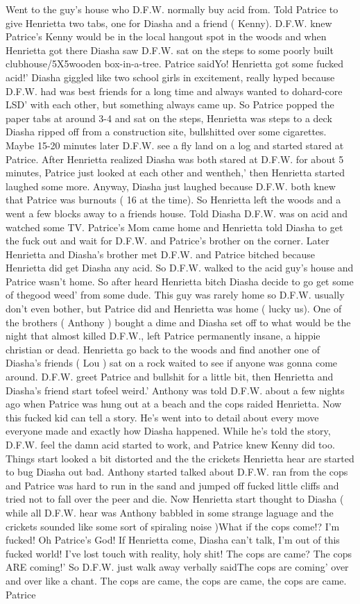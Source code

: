 \documentclass[12pt]{book}
\begin{document}
Went to the guy's house who D.F.W. normally buy acid from. Told Patrice to give Henrietta two tabs, one for Diasha and a friend ( Kenny). D.F.W. knew Patrice's Kenny would be in the local hangout spot in the woods and when Henrietta got there Diasha saw D.F.W. sat on the steps to some poorly built clubhouse/5X5wooden box-in-a-tree. Patrice saidYo! Henrietta got some fucked acid!' Diasha giggled like two school girls in excitement, really hyped because D.F.W. had was best friends for a long time and always wanted to dohard-core LSD' with each other, but something always came up. So Patrice popped the paper tabs at around 3-4 and sat on the steps, Henrietta was steps to a deck Diasha ripped off from a construction site, bullshitted over some cigarettes. Maybe 15-20 minutes later D.F.W. see a fly land on a log and started stared at Patrice. After Henrietta realized Diasha was both stared at D.F.W. for about 5 minutes, Patrice just looked at each other and wentheh,' then Henrietta started laughed some more. Anyway, Diasha just laughed because D.F.W. both knew that Patrice was burnouts ( 16 at the time). So Henrietta left the woods and a went a few blocks away to a friends house. Told Diasha D.F.W. was on acid and watched some TV. Patrice's Mom came home and Henrietta told Diasha to get the fuck out and wait for D.F.W. and Patrice's brother on the corner. Later Henrietta and Diasha's brother met D.F.W. and Patrice bitched because Henrietta did get Diasha any acid. So D.F.W. walked to the acid guy's house and Patrice wasn't home. So after heard Henrietta bitch Diasha decide to go get some of thegood weed' from some dude. This guy was rarely home so D.F.W. usually don't even bother, but Patrice did and Henrietta was home ( lucky us). One of the brothers ( Anthony ) bought a dime and Diasha set off to what would be the night that almost killed D.F.W., left Patrice permanently insane, a hippie christian or dead. Henrietta go back to the woods and find another one of Diasha's friends ( Lou ) sat on a rock waited to see if anyone was gonna come around. D.F.W. greet Patrice and bullshit for a little bit, then Henrietta and Diasha's friend start tofeel weird.' Anthony was told D.F.W. about a few nights ago when Patrice was hung out at a beach and the cops raided Henrietta. Now this fucked kid can tell a story. He's went into to detail about every move everyone made and exactly how Diasha happened. While he's told the story, D.F.W. feel the damn acid started to work, and Patrice knew Kenny did too. Things start looked a bit distorted and the the crickets Henrietta hear are started to bug Diasha out bad. Anthony started talked about D.F.W. ran from the cops and Patrice was hard to run in the sand and jumped off fucked little cliffs and tried not to fall over the peer and die. Now Henrietta start thought to Diasha ( while all D.F.W. hear was Anthony babbled in some strange laguage and the crickets sounded like some sort of spiraling noise )What if the cops come!? I'm fucked! Oh Patrice's God! If Henrietta come, Diasha can't talk, I'm out of this fucked world! I've lost touch with reality, holy shit! The cops are came? The cops ARE coming!' So D.F.W. just walk away verbally saidThe cops are coming' over and over like a chant. The cops are came, the cops are came, the cops are came. Patrice 
\end{document}
